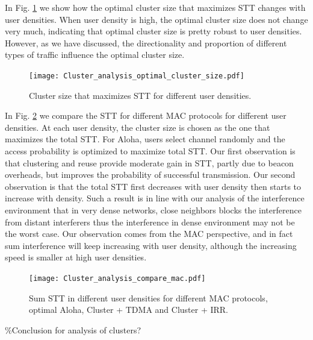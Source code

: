 \documentclass[10pt, conference, letterpaper]{IEEEtran}
\begin{document}
In Fig. \ref{fig:clustereanalysis:optimal_cluster_size} we show how the optimal cluster size that maximizes STT changes with user densities. When user density is high, the optimal cluster size does not change very much, indicating that optimal cluster size is pretty robust to user densities. However, as we have discussed, the directionality and proportion of different types of traffic influence the optimal cluster size. 

\begin{figure}
	\centering
	\texttt{[image: Cluster\_analysis\_optimal\_cluster\_size.pdf]}
	\caption{Cluster size that maximizes STT for different user densities.}
	\label{fig:clustereanalysis:optimal_cluster_size}
\end{figure}

In Fig. \ref{fig:clusteranalysis:compare_mac} we compare the STT for different MAC protocols for different user densities. At each user density, the cluster size is chosen as the one that maximizes the total STT. For Aloha, users select channel randomly and the access probability is optimized to maximize total STT. Our first observation is that clustering and reuse provide moderate gain in STT, partly due to beacon overheads, but improves the probability of successful transmission. Our second observation is that the total STT first decreases with user density then starts to increase with density. Such a result is in line with our analysis of the interference environment that in very dense networks, close neighbors blocks the interference from distant interferers thus the interference in dense environment may not be the worst case. Our observation comes from the MAC perspective, and in fact sum interference will keep increasing with user density, although the increasing speed is smaller at high user densities. 

\begin{figure}
	\centering
	\texttt{[image: Cluster\_analysis\_compare\_mac.pdf]}
	\caption{Sum STT in different user densities for different MAC protocols, optimal Aloha, Cluster + TDMA and Cluster + IRR.}
	\label{fig:clusteranalysis:compare_mac}
\end{figure}

\%Conclusion for analysis of clusters?
\end{document}

